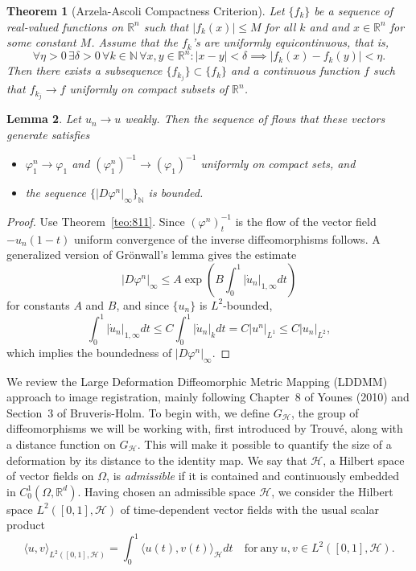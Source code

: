 \documentclass{article}
\theoremstyle{plain}
\newtheorem{teo}{Theorem}[section]
\newtheorem{lem}[teo]{Lemma}
\theoremstyle{definition}
\numberwithin{equation}{section}
\newcommand{\N}{\ensuremath{\mathbb{N}}}
\newcommand{\R}{\ensuremath{\mathbb{R}}}
\begin{document}
\begin{teo}[Arzela-Ascoli  Compactness  Criterion]
Let $\{f_k\}$ be a sequence of real-valued functions on $\R^n$  such that $|f_k(x)|\leq M$ for all $k$ and and $x\in\R^n$ for some constant $M$. Assume that the $f_k$'s are uniformly equicontinuous, that is, \[\forall \eta>0\,\exists\delta>0\,\forall k\in\N\,\forall x,y\in\R^n:|x-y|<\delta\implies|f_k(x)-f_k(y)|<\eta.\] Then there exists a subsequence $\{f_{k_j}\}\subset\{f_k\}$ and a continuous function $f$ such that $f_{k_j}\to f$ uniformly on compact subsets of $\R^n$.
\end{teo}

\begin{lem}
\label{lem:weak}
Let $u_n\to u$ weakly. Then the sequence of flows that these vectors generate satisfies 
\begin{itemize}
	\item $\varphi_1^n\to \varphi_1$ and $(\varphi_1^n)^{-1}\to (\varphi_1)^{-1}$ uniformly on compact sets, and
	\item the sequence $\{|D\varphi^n|_\infty\}_\N$ is bounded.
\end{itemize}
\end{lem}
\begin{proof}
Use Theorem~\ref{teo:811}. Since $(\varphi^n)_t^{-1}$ is the flow of the vector field $-u_n(1-t)$ uniform convergence of the inverse diffeomorphisms follows. A  generalized  version  of Grönwall's lemma gives the estimate
\[
|D\varphi^n|_\infty\leq A \exp\left(B\int_0^1 |\dot{u}_n|_{1,\infty}dt\right)
\]
for constants $A$ and $B$, and since $\{u_n\}$ is $L^2$-bounded,
\[
\int_0^1|\dot{u}_n|_{1,\infty}dt\leq C\int_0^1 |\dot{u}_n|_k dt =C|u^n|_{L^1}\leq C|u_n|_{L^2}, 
\]
which implies the boundedness of $|D\varphi^n|_\infty$.
\end{proof}



We review the Large Deformation Diffeomorphic Metric Mapping (LDDMM) approach to image registration, mainly following 
Chapter~8 of Younes (2010) and Section~3 of Bruveris-Holm. To begin with, we define $G_{\mathcal{H}}$, the group of diffeomorphisms we will be working with, first introduced by Trouvé, along with a distance function on $G_{\mathcal{H}}$. This will make it possible to quantify the size of a deformation by its distance to the identity map.  We say that $\mathcal{H}$, a Hilbert space of vector fields on $\Omega$, is \emph{admissible} if it is contained and continuously embedded in $C^1_0(\Omega,\mathbb{R}^d)$.  Having chosen an admissible space $\mathcal{H}$, we consider the Hilbert space $L^2([0,1],\mathcal{H})$ of time-dependent vector fields with the usual scalar product
$$\langle u,v\rangle_{L^2([0,1],\mathcal{H})}=\int_0^1\langle u(t),v(t)\rangle_{\mathcal{H}} d t\quad\mathrm{for\ any\ }u,v\in
L^2([0,1],\mathcal{H}).$$
\end{document}
